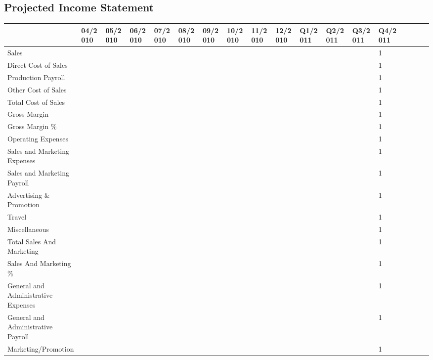 \documentclass[11pt,a4paper,titlepage]{article}
\begin{document}
\begin{landscape}

\subsection{Projected Income Statement}
\begin{scriptsize}
\begin{tabular}{ | l | l | l | l | l | l | l | l | l | l | l | l | l | l | l | l | l | l |}\hline
  & 04/2010 & 05/2010 & 06/2010 & 07/2010 & 08/2010 & 09/2010 & 10/2010 & 11/2010 & 12/2010 & Q1/2011 & Q2/2011 & Q3/2011 & Q4/2011\\\hline
  Sales & & & & & & & & & & & & & 1\\ \hline
  Direct Cost of Sales & & & & & & & & & & & & & 1\\\hline
  Production Payroll & & & & & & & & & & & & & 1\\\hline
  Other Cost of Sales & & & & & & & & & & & & & 1\\\hline
  Total Cost of Sales & & & & & & & & & & & & & 1\\\hline
  Gross Margin & & & & & & & & & & & & & 1\\\hline
  Gross Margin \% & & & & & & & & & & & & & 1\\\hline
  Operating Expenses & & & & & & & & & & & & & 1\\\hline
  Sales and Marketing Expenses & & & & & & & & & & & & & 1\\\hline
  Sales and Marketing Payroll & & & & & & & & & & & & & 1\\\hline
  Advertising \& Promotion & & & & & & & & & & & & & 1\\\hline
  Travel & & & & & & & & & & & & & 1\\\hline
  Miscellaneous & & & & & & & & & & & & & 1\\\hline
  Total Sales And Marketing & & & & & & & & & & & & & 1\\\hline
  Sales And Marketing \% & & & & & & & & & & & & & 1\\\hline
  General and Administrative Expenses & & & & & & & & & & & & & 1\\\hline
  General and Administrative Payroll & & & & & & & & & & & & & 1\\\hline
  Marketing/Promotion & & & & & & & & & & & & & 1\\\hline

\end{tabular}
\end{scriptsize}
\end{landscape}
\end{document}
